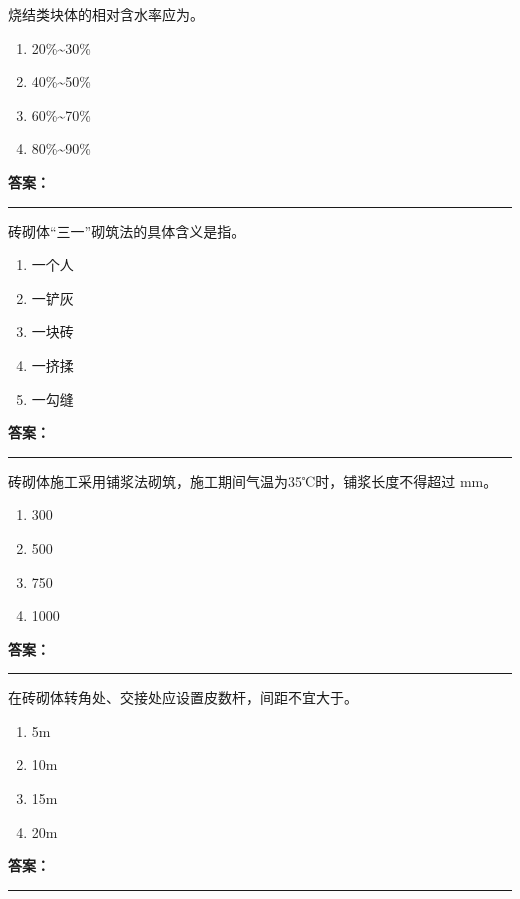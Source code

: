 \documentclass[UTF8,fontset=fandol,11pt]{ctexart}
\newcommand{\answerline}{\textcolor{answerred}{\rule{2.4cm}{0.7pt}}}
\begin{document}
\vspace{0.2em}

\begin{quizbox}[title={第 11 题}]
烧结类块体的相对含水率应为。\\
\begin{enumerate}[label=\Alph*.]
\item 20\%\textasciitilde{}30\%
\item 40\%\textasciitilde{}50\%
\item 60\%\textasciitilde{}70\%
\item 80\%\textasciitilde{}90\%
\end{enumerate}
\textbf{\textcolor{answerred}{答案：}} \answerline
\end{quizbox}

\vspace{0.2em}

\begin{quizbox}[title={第 12 题}]
砖砌体“三一”砌筑法的具体含义是指。\\
\begin{enumerate}[label=\Alph*.]
\item 一个人
\item 一铲灰
\item 一块砖
\item 一挤揉
\item 一勾缝
\end{enumerate}
\textbf{\textcolor{answerred}{答案：}} \answerline
\end{quizbox}

\vspace{0.2em}

\begin{quizbox}[title={第 13 题}]
砖砌体施工采用铺浆法砌筑，施工期间气温为35℃时，铺浆长度不得超过 mm。\\
\begin{enumerate}[label=\Alph*.]
\item 300
\item 500
\item 750
\item 1000
\end{enumerate}
\textbf{\textcolor{answerred}{答案：}} \answerline
\end{quizbox}

\vspace{0.2em}

\begin{quizbox}[title={第 14 题}]
在砖砌体转角处、交接处应设置皮数杆，间距不宜大于。\\
\begin{enumerate}[label=\Alph*.]
\item 5m
\item 10m
\item 15m
\item 20m
\end{enumerate}
\textbf{\textcolor{answerred}{答案：}} \answerline
\end{quizbox}
\end{document}

